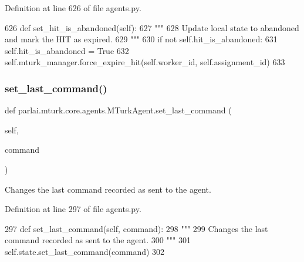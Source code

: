 Definition at line 626 of file agents.\+py.


\begin{DoxyCode}
626     \textcolor{keyword}{def }set\_hit\_is\_abandoned(self):
627         \textcolor{stringliteral}{"""}
628 \textcolor{stringliteral}{        Update local state to abandoned and mark the HIT as expired.}
629 \textcolor{stringliteral}{        """}
630         \textcolor{keywordflow}{if} \textcolor{keywordflow}{not} self.hit\_is\_abandoned:
631             self.hit\_is\_abandoned = \textcolor{keyword}{True}
632             self.mturk\_manager.force\_expire\_hit(self.worker\_id, self.assignment\_id)
633 
\end{DoxyCode}
\mbox{\label{classparlai_1_1mturk_1_1core_1_1agents_1_1MTurkAgent_a04a89ff05aa910e6ff8cc58e96d61b21}} 
\subsubsection{\texorpdfstring{set\+\_\+last\+\_\+command()}{set\_last\_command()}}
{\footnotesize\ttfamily def parlai.\+mturk.\+core.\+agents.\+M\+Turk\+Agent.\+set\+\_\+last\+\_\+command (\begin{DoxyParamCaption}\item[{}]{self,  }\item[{}]{command }\end{DoxyParamCaption})}

\begin{DoxyVerb}Changes the last command recorded as sent to the agent.
\end{DoxyVerb}
 

Definition at line 297 of file agents.\+py.


\begin{DoxyCode}
297     \textcolor{keyword}{def }set\_last\_command(self, command):
298         \textcolor{stringliteral}{"""}
299 \textcolor{stringliteral}{        Changes the last command recorded as sent to the agent.}
300 \textcolor{stringliteral}{        """}
301         self.state.set\_last\_command(command)
302 
\end{DoxyCode}
\mbox{\label{classparlai_1_1mturk_1_1core_1_1agents_1_1MTurkAgent_a59bc035a28a067a5408a2c15f9f94604}} 
